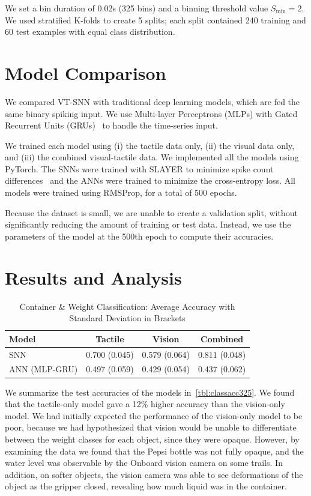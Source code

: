 \documentclass[fyp]{socreport}
\begin{document}
We set a bin duration of 0.02s (325 bins) and a binning threshold value
$S_{\text{min}} = 2$. We used stratified K-folds to create 5 splits; each split
contained 240 training and 60 test examples with equal class distribution.

\section{Model Comparison}
We compared VT-SNN with traditional deep learning models, which are fed the same
binary spiking input. We use Multi-layer Perceptrons (MLPs) with Gated Recurrent
Units (GRUs)~\cite{cho2014learning} to handle the time-series input.

We trained each model using (i) the tactile data only, (ii) the visual data
only, and (iii) the combined visual-tactile data. We implemented all the models
using PyTorch. The SNNs were trained with SLAYER to minimize spike count
differences~\cite{NIPS2018_7415} and the ANNs were trained to minimize the
cross-entropy loss. All models were trained using RMSProp, for a total of 500
epochs.

Because the dataset is small, we are unable to create a validation split,
without significantly reducing the amount of training or test data. Instead, we
use the parameters of the model at the 500th epoch to compute their accuracies.

\section{Results and Analysis}

\begin{table}
  \centering
  \caption{Container \& Weight Classification: Average Accuracy with Standard
    Deviation in Brackets\label{tbl:classacc325}}
  \begin{tabular}{lccc}
    \toprule
    \textbf{Model} & \textbf{Tactile} & \textbf{Vision} & \textbf{Combined} \\
    \midrule
    SNN  & {0.700} (0.045) & 0.579 (0.064)  & 0.811 (0.048)\\
    ANN (MLP-GRU) & 0.497 (0.059) & 0.429 (0.054) & 0.437 (0.062)\\
    \bottomrule
  \end{tabular}
\end{table}

We summarize the test accuracies of the models in~\autoref{tbl:classacc325}. We
found that the tactile-only model gave a 12\% higher accuracy than the
vision-only model. We had initially expected the performance of the vision-only
model to be poor, because we had hypothesized that vision would be unable to
differentiate between the weight classes for each object, since they were
opaque. However, by examining the data we found that the Pepsi bottle was not
fully opaque, and the water level was observable by the Onboard vision camera on
some trails. In addition, on softer objects, the vision camera was able to see
deformations of the object as the gripper closed, revealing how much liquid was
in the container.
\end{document}
